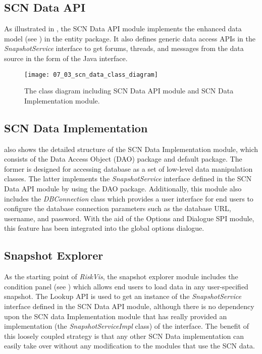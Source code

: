 \subsection{SCN Data API}

As illustrated in , the SCN Data API module implements the enhanced data model (see ) in the entity package. It also defines generic data access APIs in the \emph{SnapshotService} interface to get forums, threads, and messages from the data source in the form of the Java interface.

\begin{figure}[!htb]
  \centering
  \texttt{[image: 07\_03\_scn\_data\_class\_diagram]}
  \caption{The class diagram including SCN Data API module and SCN Data Implementation module.}
  \label{Figure:07_03}
\end{figure}

\subsection{SCN Data Implementation}

 also shows the detailed structure of the SCN Data Implementation module, which consists of the Data Access Object (DAO) package and default package. The former is designed for accessing database as a set of low-level data manipulation classes. The latter implements the \emph{SnapshotService} interface defined in the SCN Data API module by using the DAO package. Additionally, this module also includes the \emph{DBConnection} class which provides a user interface for end users to configure the database connection parameters such as the database URL, username, and password. With the aid of the Options and Dialogue SPI module, this feature has been integrated into the global options dialogue.

\subsection{Snapshot Explorer}

As the starting point of \emph{RiskVis}, the snapshot explorer module includes the condition panel (see ) which allows end users to load data in any user-specified snapshot. The Lookup API is used to get an instance of the \emph{SnapshotService} interface defined in the SCN Data API module, although there is no dependency upon the SCN data Implementation module that has really provided an implementation (the \emph{SnapshotServiceImpl} class) of the interface. The benefit of this loosely coupled strategy is that any other SCN Data implementation can easily take over without any modification to the modules that use the SCN data.

